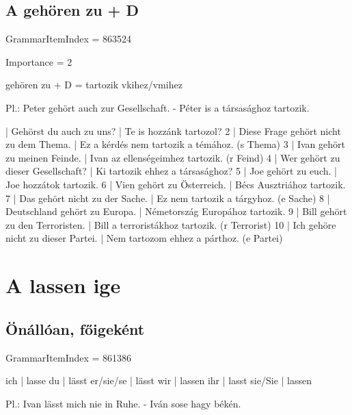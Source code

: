 \documentclass{article}
\newenvironment{desc}{\verbatim}{\endverbatim}
\newenvironment{exmp}{\verbatim}{\endverbatim}
\begin{document}
\subsection{A gehören zu + D}

GrammarItemIndex = 863524

Importance = 2

\begin{desc}
gehören zu + D = tartozik vkihez/vmihez

Pl.: Peter gehört auch zur Gesellschaft. - Péter is a társasághoz tartozik.
\end{desc}

\begin{exmp}
1 | Gehörst du auch zu uns? | Te is hozzánk tartozol?
2 | Diese Frage gehört nicht zu dem Thema. | Ez a kérdés nem tartozik a témához. (s Thema)
3 | Ivan gehört zu meinen Feinde. | Ivan az ellenségeimhez tartozik. (r Feind)
4 | Wer gehört zu dieser Gesellschaft? | Ki tartozik ehhez a társasághoz?
5 | Joe gehört zu euch. | Joe hozzátok tartozik.
6 | Vien gehört zu Österreich. | Bécs Ausztriához tartozik.
7 | Das gehört nicht zu der Sache. | Ez nem tartozik a tárgyhoz. (e Sache)
8 | Deutschland gehört zu Europa. | Németország Europához tartozik.
9 | Bill gehört zu den Terroristen. | Bill a terroristákhoz tartozik. (r Terrorist)
10 | Ich gehöre nicht zu dieser Partei. | Nem tartozom ehhez a párthoz. (e Partei)
\end{exmp}

\section{A lassen ige}

\subsection{Önállóan, főigeként}

GrammarItemIndex = 861386

\begin{desc}
ich       | lasse
du        | lässt
er/sie/se | lässt
wir       | lassen
ihr       | lasst
sie/Sie   | lassen

Pl.: Ivan lässt mich nie in Ruhe. - Iván sose hagy békén.
\end{desc}
\end{document}
